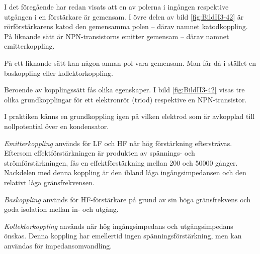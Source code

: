 
I det föregående har redan visats att en av polerna i ingången respektive
utgången i en förstärkare är gemensam.
I övre delen av bild \ref{fig:BildII3-42} är rörförstärkarens katod den gemensamma
polen -- därav namnet katodkoppling.
På liknande sätt är NPN-transistorns emitter gemensam
-- därav namnet emitterkoppling.

På ett liknande sätt kan någon annan pol vara gemensam.
Man får då i stället en baskoppling eller kollektorkoppling.

Beroende av kopplingssätt fås olika egenskaper.
I bild \ref{fig:BildII3-42} visas tre olika grundkopplingar för ett elektronrör (triod)
respektive en NPN-transistor.

I praktiken känns en grundkoppling igen på vilken elektrod som är
avkopplad till nollpotential över en kondensator.

\emph{Emitterkoppling} används för LF och HF när hög förstärkning eftersträvas.
Eftersom effektförstärkningen är produkten av spännings- och
strömförstärkningen, fås en effektförstärkning mellan 200 och 50000
gånger.
Nackdelen med denna koppling är den ibland låga ingångsimpedansen och den
relativt låga gränsfrekvensen.

\emph{Baskoppling} används för HF-förstärkare på grund av sin höga
gränsfrekvens och goda isolation mellan in- och utgång.

\emph{Kollektorkoppling} används när hög ingångsimpe\-da\-ns och
utgångsimpedans önskas.
Denna koppling har emellertid ingen spänningsförstärkning, men kan användas för
impedansomvandling.

